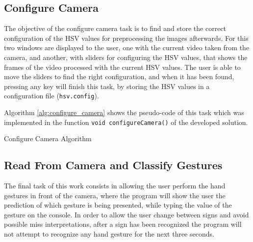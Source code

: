 \documentclass[a4paper,10pt,english]{article}
\begin{document}
        \subsection{Configure Camera}
        
        The objective of the configure camera task is to find and store the correct configuration of the HSV values for preprocessing the images afterwards. For this two windows are displayed to the user, one with the current video taken from the camera, and another, with sliders for configuring the HSV values, that shows the frames of the video processed with the current HSV values. The user is able to move the sliders to find the right configuration, and when it has been found, pressing any key will finish this task, by storing the HSV values in a configuration file (\texttt{hsv.config}).
        
        Algorithm \ref{alg:configure_camera} shows the pseudo-code of this task which was implemented in the function \texttt{void configureCamera()} of the developed solution.
        
        \begin{algorithm}[H]
            \BlankLine
            \caption{Configure Camera Algorithm} \label{alg:configure_camera}
        \end{algorithm}
        
        \subsection{Read From Camera and Classify Gestures}
         
         The final task of this work consists in allowing the user perform the hand gestures in front of the camera, where the program will show the user the prediction of which gesture is being presented, while typing the value of the gesture on the console. In order to allow the user change between signs and avoid possible miss interpretations, after a sign has been recognized the program will not attempt to recognize any hand gesture for the next three seconds.
         
\end{document}
